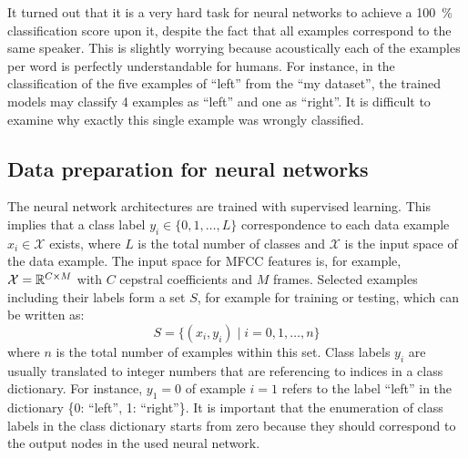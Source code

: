 \FloatBarrier
\noindent
It turned out that it is a very hard task for neural networks to achieve a \SI{100}{\percent} classification score upon it, despite the fact that all examples correspond to the same speaker.
This is slightly worrying because acoustically each of the examples per word is perfectly understandable for humans.
For instance, in the classification of the five examples of \enquote{left} from the \enquote{my dataset}, the trained models may classify 4 examples as \enquote{left} and one as \enquote{right}.
It is difficult to examine why exactly this single example was wrongly classified.



\subsection{Data preparation for neural networks}\label{sec:exp_data_prep}
The neural network architectures are trained with supervised learning.
This implies that a class label $y_i \in \{0, 1, \dots, L\}$ correspondence to each data example $x_i \in \mathcal{X}$ exists, where $L$ is the total number of classes and $\mathcal{X}$ is the input space of the data example.
The input space for MFCC features is, for example, $\mathcal{X} = \mathbb{R}^{C \times M}$ with $C$ cepstral coefficients and $M$ frames.
Selected examples including their labels form a set $S$, for example for training or testing, which can be written as:
\begin{equation}\label{eq:exp_dataset}
  S = \{ (x_i, y_i) \mid i = 0, 1, \dots, n \}
\end{equation}
where $n$ is the total number of examples within this set.
Class labels $y_i$ are usually translated to integer numbers that are referencing to indices in a class dictionary.
For instance, $y_1 = 0$ of example $i=1$ refers to the label \enquote{left} in the dictionary \{0: \enquote{left}, 1: \enquote{right}\}.
It is important that the enumeration of class labels in the class dictionary starts from zero because they should correspond to the output nodes in the used neural network.

